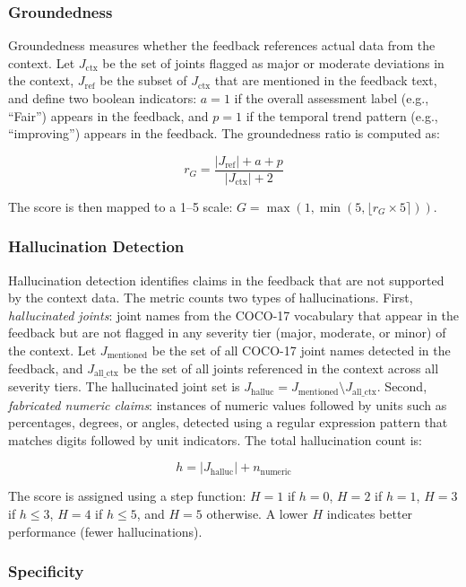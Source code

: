 \subsubsection{Groundedness}

Groundedness measures whether the feedback references actual data from the context. Let $J_{\text{ctx}}$ be the set of joints flagged as major or moderate deviations in the context, $J_{\text{ref}}$ be the subset of $J_{\text{ctx}}$ that are mentioned in the feedback text, and define two boolean indicators: $a = 1$ if the overall assessment label (e.g., ``Fair'') appears in the feedback, and $p = 1$ if the temporal trend pattern (e.g., ``improving'') appears in the feedback. The groundedness ratio is computed as:

\[
r_G = \frac{|J_{\text{ref}}| + a + p}{|J_{\text{ctx}}| + 2}
\]

The score is then mapped to a 1--5 scale: $G = \max(1, \min(5, \lfloor r_G \times 5 \rceil))$.


\subsubsection{Hallucination Detection}

Hallucination detection identifies claims in the feedback that are not supported by the context data. The metric counts two types of hallucinations. First, \textit{hallucinated joints}: joint names from the COCO-17 vocabulary that appear in the feedback but are not flagged in any severity tier (major, moderate, or minor) of the context. Let $J_{\text{mentioned}}$ be the set of all COCO-17 joint names detected in the feedback, and $J_{\text{all\_ctx}}$ be the set of all joints referenced in the context across all severity tiers. The hallucinated joint set is $J_{\text{halluc}} = J_{\text{mentioned}} \setminus J_{\text{all\_ctx}}$. Second, \textit{fabricated numeric claims}: instances of numeric values followed by units such as percentages, degrees, or angles, detected using a regular expression pattern that matches digits followed by unit indicators. The total hallucination count is:

\[
h = |J_{\text{halluc}}| + n_{\text{numeric}}
\]

The score is assigned using a step function: $H = 1$ if $h = 0$, $H = 2$ if $h = 1$, $H = 3$ if $h \leq 3$, $H = 4$ if $h \leq 5$, and $H = 5$ otherwise. A lower $H$ indicates better performance (fewer hallucinations).


\subsubsection{Specificity}

